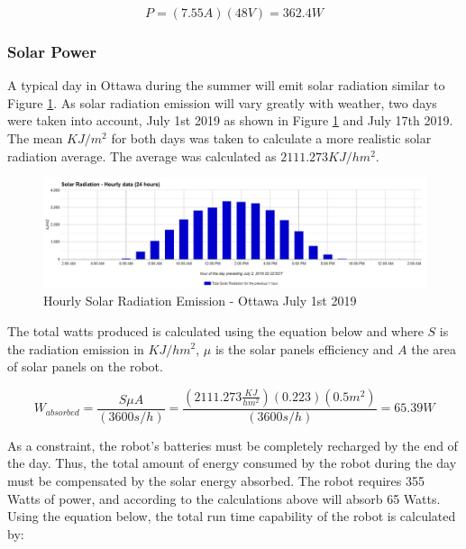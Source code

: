 \begin{equation}
    P = (7.55A)(48V) = 362.4W
\end{equation}{}

\subsubsection{Solar Power} \label{subsub:solar_power}

A typical day in Ottawa during the summer will emit solar radiation similar to Figure \ref{fig:solar_radiation}. As solar radiation emission will vary greatly with weather, two days were taken into account, July 1st 2019 as shown in Figure \ref{fig:solar_radiation} and July 17th 2019. The mean $KJ/m^2$ for both days was taken to calculate a more realistic solar radiation average. The average was calculated as $2111.273 KJ/hm^2$.

\begin{figure}
    \centering
    \includegraphics[width=\textwidth]{3_SystemModelling/img/SunCalculation.PNG}
    \caption{Hourly Solar Radiation Emission - Ottawa July 1st 2019 \cite{environment_and_climate_change_canada_solar_nodate}}
    \label{fig:solar_radiation}
\end{figure}{}


The total watts produced is calculated using the equation below and where $S$ is the radiation emission in $KJ/hm^2$, $\mu$ is the solar panels efficiency \cite{sunpower_solar_2018} and $A$ the area of solar panels on the robot. 

\begin{equation}
    W_{absorbed} = \frac{S \mu A }{(3600 s/h)} = \frac{(2111.273 \frac{KJ}{h m^2})(0.223)(0.5 m^2)}{(3600 s/h)} = 65.39 W
\end{equation}

As a constraint, the robot's batteries must be completely recharged by the end of the day. Thus, the total amount of energy consumed by the robot during the day must be compensated by the solar energy absorbed. The robot requires 355 Watts of power, and according to the calculations above will absorb 65 Watts. Using the equation below, the total run time capability of the robot is calculated by:

